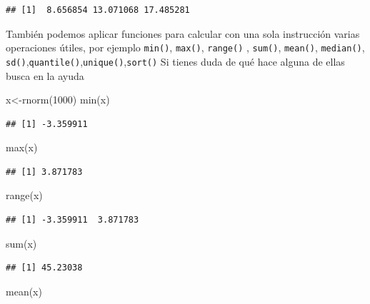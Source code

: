 \documentclass[
]{book}
\newenvironment{Shaded}{\begin{snugshade}}{\end{snugshade}}
\newcommand{\DecValTok}[1]{\textcolor[rgb]{0.00,0.00,0.81}{#1}}
\newcommand{\FunctionTok}[1]{\textcolor[rgb]{0.00,0.00,0.00}{#1}}
\newcommand{\NormalTok}[1]{#1}
\newcommand{\OtherTok}[1]{\textcolor[rgb]{0.56,0.35,0.01}{#1}}
\begin{document}
\begin{verbatim}
## [1]  8.656854 13.071068 17.485281
\end{verbatim}

También podemos aplicar funciones para calcular con una sola instrucción varias operaciones útiles, por ejemplo \texttt{min()}, \texttt{max()}, \texttt{range()} ,
\texttt{sum()}, \texttt{mean()}, \texttt{median()}, \texttt{sd()},\texttt{quantile()},\texttt{unique()},\texttt{sort()}
Si tienes duda de qué hace alguna de ellas busca en la ayuda

\begin{Shaded}
\begin{Highlighting}[]
\NormalTok{x}\OtherTok{\textless{}{-}}\FunctionTok{rnorm}\NormalTok{(}\DecValTok{1000}\NormalTok{)}
\FunctionTok{min}\NormalTok{(x)}
\end{Highlighting}
\end{Shaded}

\begin{verbatim}
## [1] -3.359911
\end{verbatim}

\begin{Shaded}
\begin{Highlighting}[]
\FunctionTok{max}\NormalTok{(x)}
\end{Highlighting}
\end{Shaded}

\begin{verbatim}
## [1] 3.871783
\end{verbatim}

\begin{Shaded}
\begin{Highlighting}[]
\FunctionTok{range}\NormalTok{(x)}
\end{Highlighting}
\end{Shaded}

\begin{verbatim}
## [1] -3.359911  3.871783
\end{verbatim}

\begin{Shaded}
\begin{Highlighting}[]
\FunctionTok{sum}\NormalTok{(x)}
\end{Highlighting}
\end{Shaded}

\begin{verbatim}
## [1] 45.23038
\end{verbatim}

\begin{Shaded}
\begin{Highlighting}[]
\FunctionTok{mean}\NormalTok{(x)}
\end{Highlighting}
\end{Shaded}
\end{document}
